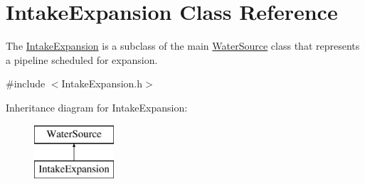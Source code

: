\hypertarget{classIntakeExpansion}{}\section{Intake\+Expansion Class Reference}
\label{classIntakeExpansion}


The {\ttfamily \mbox{\hyperlink{classIntakeExpansion}{Intake\+Expansion}}} is a subclass of the main {\ttfamily \mbox{\hyperlink{classWaterSource}{Water\+Source}}} class that represents a pipeline scheduled for expansion.  




{\ttfamily \#include $<$Intake\+Expansion.\+h$>$}

Inheritance diagram for Intake\+Expansion\+:\begin{figure}[H]
\begin{center}
\leavevmode
\includegraphics[height=2.000000cm]{classIntakeExpansion}
\end{center}
\end{figure}
